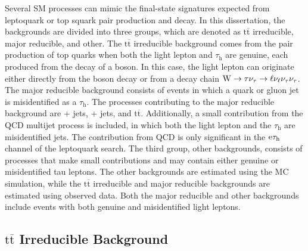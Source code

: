 \documentclass[12pt]{thesis}  %
\newcommand{\tauh}{\ensuremath{\tau_{\text{h}}}\xspace}
\newcommand{\Pe}{\ensuremath{\cmsSymbolFace{e}}\xspace}
\newcommand{\etau}{\ensuremath{\Pe\tauh}\xspace}
\renewcommand{\ttbar}{\ensuremath{\mathrm{t}\overline{\mathrm{t}}}\xspace}
\begin{document}
Several SM processes can mimic the final-state signatures expected from leptoquark or top squark pair production and decay. In this dissertation, the backgrounds are divided into three groups, which are denoted as \ttbar irreducible, major reducible, and other. The \ttbar irreducible background comes from the pair production of top quarks when both the light lepton and \tauh are genuine, each produced from the decay of a \W boson. In this case, the light lepton can originate either directly from the \W boson decay or from a decay chain $\mathrm{W} \rightarrow \tau  \nu_{\tau} \rightarrow \ell\nu_{\ell} \nu_{\tau} \nu_{\tau}$. The major reducible background consists of events in which a quark or gluon jet is
misidentified as a \tauh. The processes contributing to the major reducible background are \W + jets, \Z + jets, and \ttbar. Additionally, a small contribution from the QCD multijet process is included, in which both the light lepton and the \tauh are misidentified jets. The contribution from QCD is only significant in the \etau channel of the leptoquark search. The third group, other backgrounds, consists of processes that make small contributions and may contain either genuine or misidentified tau leptons. The other backgrounds are estimated using the MC simulation, while the \ttbar irreducible and major reducible backgrounds are estimated using observed data. Both the major reducible and other backgrounds include events with both genuine and misidentified light leptons.


\subsection{\texorpdfstring{\ttbar}{ttbar} Irreducible Background
\label{sec:ttbarbkg}}
\end{document}
